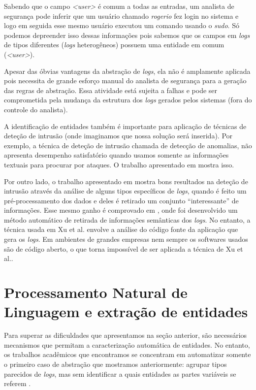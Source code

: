 \documentclass[
	12pt,				%
	openright,			%
	twoside,			%
	a4paper,			%
	english,			%
	spanish,			%
	brazil,				%
	]{abntex2}
\begin{document}
Sabendo que o campo \emph{<user>} é comum a todas as entradas, um analista de segurança pode inferir que um usuário chamado \emph{rogerio} fez login no sistema e logo em seguida esse mesmo usuário executou um comando usando o \emph{sudo}. Só podemos depreender isso dessas informações pois sabemos que os campos em \emph{logs} de tipos diferentes (\emph{logs} heterogêneos) possuem uma entidade em comum (\emph{<user>}).

Apesar das óbvias vantagens da abstração de \emph{logs}, ela não é amplamente aplicada pois necessita de grande esforço manual do analista de segurança para a geração das regras de abstração. Essa atividade está sujeita a falhas e pode ser comprometida pela mudança da estrutura dos \emph{logs} gerados pelos sistemas (fora do controle do analista).

A identificação de entidades também é importante para aplicação de técnicas de deteção de intrusão (onde imaginamos que nossa solução será inserida). Por exemplo, a técnica de deteção de intrusão chamada de detecção de anomalias, não apresenta desempenho satisfatório quando usamos somente as informações textuais para procurar por ataques. O trabalho apresentado em \cite{li2013automatic} mostra isso.

Por outro lado, o trabalho apresentado em \cite{yen2013beehive} mostra bons resultados na deteção de intrusão através da análise de alguns tipos específicos de \emph{logs}, quando é feito um pré-processamento dos dados e deles é retirado um conjunto ``interessante'' de informações. Esse mesmo ganho é comprovado em \cite{xu2009detecting}, onde foi desenvolvido um método automático de retirada de informações semânticas dos \emph{logs}. No entanto, a técnica usada em Xu et al. envolve a análise do código fonte da aplicação que gera os \emph{logs}. Em ambientes de grandes empresas nem sempre os softwares usados são de código aberto, o que torna impossível de ser aplicada a técnica de Xu et al..

\section{Processamento Natural de Linguagem e extração de entidades}
Para superar as dificuldades que apresentamos na seção anterior, são necessários mecanismos que permitam a caracterização automática de entidades. No entanto, os trabalhos acadêmicos que encontramos se concentram em automatizar somente o primeiro caso de abstração que mostramos anteriormente: agrupar tipos parecidos de \emph{logs}, mas sem identificar a quais entidades as partes variáveis se referem \cite{vaarandi2003data, nagappan2010abstracting}.
\end{document}
